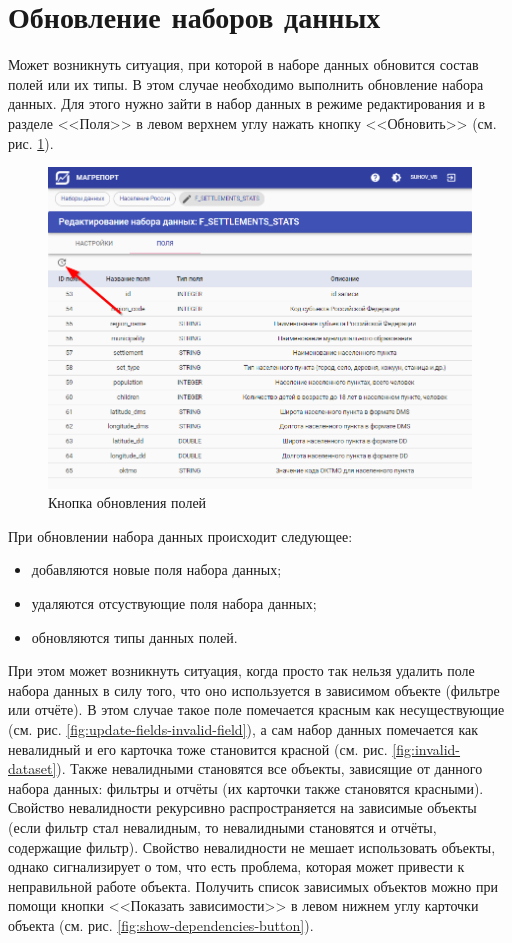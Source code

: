 \documentclass[../user-manual.tex]{subfiles}
\begin{document}
	\section{Обновление наборов данных}
	
	Может возникнуть ситуация, при которой в наборе данных обновится состав полей или их типы. В этом случае необходимо выполнить обновление набора данных. Для этого нужно зайти в набор данных в режиме редактирования и в разделе <<Поля>> в левом верхнем углу нажать кнопку <<Обновить>> (см. рис. \ref{fig:update-fields-button}).
		
	\begin{figure}[h]
		\centering
		\includegraphics[width=\graphicswidth]{img/8-update-fields-button.png}
		\caption{Кнопка обновления полей}
		\label{fig:update-fields-button}
	\end{figure}

	При обновлении набора данных происходит следующее:
	\begin{itemize}
		\item добавляются новые поля набора данных;
		\item удаляются отсуствующие поля набора данных;
		\item обновляются типы данных полей.
	\end{itemize}
	При этом может возникнуть ситуация, когда просто так нельзя удалить поле набора данных в силу того, что оно используется в зависимом объекте (фильтре или отчёте). В этом случае такое поле помечается красным как несуществующие (см. рис. \ref{fig:update-fields-invalid-field}), а сам набор данных помечается как невалидный и его карточка тоже становится красной (см. рис. \ref{fig:invalid-dataset}). Также невалидными становятся все объекты, зависящие от данного набора данных: фильтры и отчёты (их карточки также становятся красными). Свойство невалидности рекурсивно распространяется на зависимые объекты (если фильтр стал невалидным, то невалидными становятся и отчёты, содержащие фильтр). Свойство невалидности не мешает использовать объекты, однако сигнализирует о том, что есть проблема, которая может привести к неправильной работе объекта. Получить список зависимых объектов можно при помощи кнопки <<Показать зависимости>> в левом нижнем углу карточки объекта (см. рис. \ref{fig:show-dependencies-button}).
	
\end{document}
